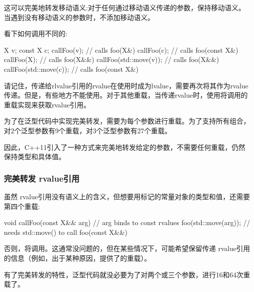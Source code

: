 这可以完美地转发移动语义:对于任何通过移动语义传递的参数，保持移动语义。当遇到没有移动语义的参数时，不添加移动语义。

看下如何调用不同的:

\begin{cppcode}
X v;
const X c;
callFoo(v); // calls foo(X&)
callFoo(c); // calls foo(const X&)
callFoo(X{}); // calls foo(X&&)
callFoo(std::move(v)); // calls foo(X&&)
callFoo(std::move(c)); // calls foo(const X&)
\end{cppcode}

请记住，传递给rlvalue引用的rvalue在使用时成为lvalue，需要再次将其作为rvalue传递。但是，有些地方不能使用。对于其他重载，当传递rvalue时，使用将调用的重载实现来获取rvalue引用。

为了在泛型代码中实现完美转发，需要为每个参数进行重载。为了支持所有组合，对2个泛型参数有9个重载，对3个泛型参数有27个重载。

因此，C++11引入了一种方式来完美地转发给定的参数，不需要任何重载，仍然保持类型和具体值。

\subsubsection{完美转发 rvalue引用}

虽然 rvalue引用没有语义上的含义，但想要用标记的常量对象的类型和值，还需要第四个重载:

\begin{cppcode}
void callFoo(const X&& arg) { // arg binds to const rvalues
	foo(std::move(arg)); // needs std::move() to call foo(const X&&)
}
\end{cppcode}

否则，将调用。这通常没问题的，但在某些情况下，可能希望保留传递 rvalue引用的信息（例如，出于某种原因，提供了的重载）。

有了完美转发的特性，泛型代码就没必要为了对两个或三个参数，进行16和64次重载了。


















